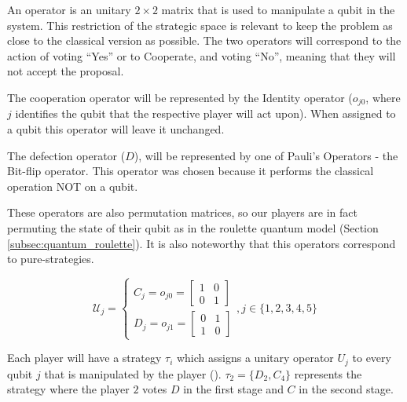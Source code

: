 An operator is an unitary $2\times2$ matrix that is used to manipulate a qubit in the system.
This restriction of the strategic space is relevant to keep the problem as close to the classical version as possible. The two operators will correspond to the action of voting ``Yes'' or to Cooperate, and voting ``No'', meaning that they will not accept the proposal.  

The cooperation operator will be represented by the Identity operator ($o_{j0}$, where $j$ identifies the qubit that the respective player will act upon). When assigned to a qubit this operator will leave it unchanged. 

The defection operator ($D$), will be represented by one of Pauli's Operators - the Bit-flip operator. This operator was chosen because it performs the classical operation NOT on a qubit.

These operators are also permutation matrices, so our players are in fact permuting the state of their qubit as in the roulette quantum model (Section \ref{subsec:quantum_roulette}). It is also noteworthy that this operators correspond to pure-strategies.

\begin{equation}
\label{eq:operators_piratas_quanticos}
\mathcal{U}_{j} = \begin{cases}
C_{j} = o_{j0}=\left[\begin{array}{cc}
1 & 0\\
0 & 1
\end{array}\right]\\
D_{j} = o_{j1}=\left[\begin{array}{cc}
0 & 1\\
1 & 0
\end{array}\right]
\end{cases} , j \in \{ 1, 2, 3, 4, 5 \}
\end{equation}

Each player will have a strategy $\tau_{i}$  which assigns a
unitary operator $U_{j}$ to every qubit $j$ that is manipulated
by the player (). $\tau_{2}= \{D_{2},C_{4}\}$ represents the strategy where the player $2$ votes $D$ in the first stage and $C$ in the second stage.

